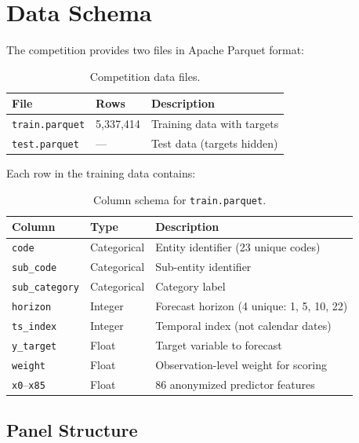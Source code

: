 \section{Data Schema}

The competition provides two files in Apache Parquet format:

\begin{table}[H]
\centering
\caption{Competition data files.}
\begin{tabular}{lll}
\toprule
\textbf{File} & \textbf{Rows} & \textbf{Description} \\
\midrule
\texttt{train.parquet} & 5,337,414 & Training data with targets \\
\texttt{test.parquet} & --- & Test data (targets hidden) \\
\bottomrule
\end{tabular}
\end{table}

Each row in the training data contains:

\begin{table}[H]
\centering
\caption{Column schema for \texttt{train.parquet}.}
\label{tab:schema}
\begin{tabular}{lll}
\toprule
\textbf{Column} & \textbf{Type} & \textbf{Description} \\
\midrule
\texttt{code} & Categorical & Entity identifier (23 unique codes) \\
\texttt{sub\_code} & Categorical & Sub-entity identifier \\
\texttt{sub\_category} & Categorical & Category label \\
\texttt{horizon} & Integer & Forecast horizon (4 unique: 1, 5, 10, 22) \\
\texttt{ts\_index} & Integer & Temporal index (not calendar dates) \\
\texttt{y\_target} & Float & Target variable to forecast \\
\texttt{weight} & Float & Observation-level weight for scoring \\
\texttt{x0}--\texttt{x85} & Float & 86 anonymized predictor features \\
\bottomrule
\end{tabular}
\end{table}

\subsection{Panel Structure}

